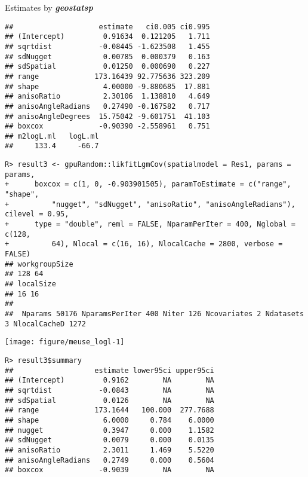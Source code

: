 \documentclass{article}\usepackage[]{graphicx}\usepackage[]{color}
\makeatletter
\def\maxwidth{ %
  \ifdim\Gin@nat@width>\linewidth
    \linewidth
  \else
    \Gin@nat@width
  \fi
}
\newenvironment{kframe}{%
 \def\at@end@of@kframe{}%
 \ifinner\ifhmode%
  \def\at@end@of@kframe{\end{minipage}}%
  \begin{minipage}{\columnwidth}%
 \fi\fi%
 \def\FrameCommand##1{\hskip\@totalleftmargin \hskip-\fboxsep
 \colorbox{shadecolor}{##1}\hskip-\fboxsep
     \hskip-\linewidth \hskip-\@totalleftmargin \hskip\columnwidth}%
 \MakeFramed {\advance\hsize-\width
   \@totalleftmargin\z@ \linewidth\hsize
   \@setminipage}}%
 {\par\unskip\endMakeFramed%
 \at@end@of@kframe}
\newenvironment{knitrout}{}{} %
\newcommand{\pkg}[1]{\textbf{\emph{#1}}}
\makeatother
\begin{document}
Estimates by \pkg{geostatsp}
\begin{knitrout}
\color{fgcolor}\begin{kframe}
\begin{verbatim}
##                    estimate   ci0.005 ci0.995
## (Intercept)         0.91634  0.121205   1.711
## sqrtdist           -0.08445 -1.623508   1.455
## sdNugget            0.00785  0.000379   0.163
## sdSpatial           0.01250  0.000690   0.227
## range             173.16439 92.775636 323.209
## shape               4.00000 -9.880685  17.881
## anisoRatio          2.30106  1.138810   4.649
## anisoAngleRadians   0.27490 -0.167582   0.717
## anisoAngleDegrees  15.75042 -9.601751  41.103
## boxcox             -0.90390 -2.558961   0.751
## m2logL.ml   logL.ml 
##     133.4     -66.7
\end{verbatim}
\end{kframe}
\end{knitrout}



\begin{knitrout}
\color{fgcolor}\begin{kframe}
\begin{verbatim}
R> result3 <- gpuRandom::likfitLgmCov(spatialmodel = Res1, params = params,
+      boxcox = c(1, 0, -0.903901505), paramToEstimate = c("range", "shape",
+          "nugget", "sdNugget", "anisoRatio", "anisoAngleRadians"), cilevel = 0.95,
+      type = "double", reml = FALSE, NparamPerIter = 400, Nglobal = c(128,
+          64), Nlocal = c(16, 16), NlocalCache = 2800, verbose = FALSE)
## workgroupSize
## 128 64
## localSize
## 16 16
## 
##  Nparams 50176 NparamsPerIter 400 Niter 126 Ncovariates 2 Ndatasets 3 NlocalCacheD 1272
\end{verbatim}
\end{kframe}

{\centering \texttt{[image: figure/meuse\_logl-1]} 

}


\begin{kframe}\begin{verbatim}
R> result3$summary
##                   estimate lower95ci upper95ci
## (Intercept)         0.9162        NA        NA
## sqrtdist           -0.0843        NA        NA
## sdSpatial           0.0126        NA        NA
## range             173.1644   100.000  277.7688
## shape               6.0000     0.784    6.0000
## nugget              0.3947     0.000    1.1582
## sdNugget            0.0079     0.000    0.0135
## anisoRatio          2.3011     1.469    5.5220
## anisoAngleRadians   0.2749     0.000    0.5604
## boxcox             -0.9039        NA        NA
\end{verbatim}
\end{kframe}
\end{knitrout}
\end{document}
